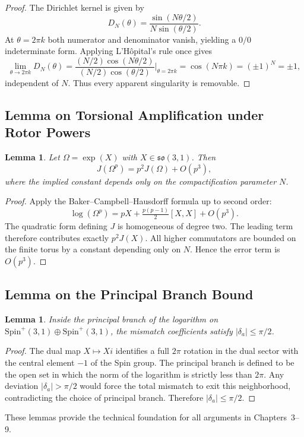 \documentclass[a4paper]{article}
\newtheorem{lemma}[theorem]{Lemma}
\theoremstyle{definition}
\theoremstyle{remark}
\begin{document}
\begin{proof}
The Dirichlet kernel is given by
\[
D_N(\theta) = \frac{\sin(N\theta/2)}{N\sin(\theta/2)}.
\]
At \( \theta = 2\pi k \) both numerator and denominator vanish, yielding a \( 0/0 \) indeterminate form. Applying L'Hôpital's rule once gives
\[
\lim_{\theta \to 2\pi k} D_N(\theta) = \frac{(N/2)\cos(N\theta/2)}{(N/2)\cos(\theta/2)} \Big|_{\theta=2\pi k} = \cos(N\pi k) = (\pm 1)^N = \pm 1,
\]
independent of \( N \). Thus every apparent singularity is removable.
\end{proof}

\subsection{Lemma on Torsional Amplification under Rotor Powers}

\begin{lemma}
Let \( \Omega = \exp(X) \) with \( X \in \mathfrak{so}(3,1) \). Then
\[
J(\Omega^p) = p^2 J(\Omega) + O(p^3),
\]
where the implied constant depends only on the compactification parameter \( N \).
\end{lemma}

\begin{proof}
Apply the Baker--Campbell--Hausdorff formula up to second order:
\[
\log(\Omega^p) = pX + \tfrac{p(p-1)}{2}[X,X] + O(p^3).
\]
The quadratic form defining \( J \) is homogeneous of degree two. The leading term therefore contributes exactly \( p^2 J(X) \). All higher commutators are bounded on the finite torus by a constant depending only on \( N \). Hence the error term is \( O(p^3) \).
\end{proof}

\subsection{Lemma on the Principal Branch Bound}

\begin{lemma}
Inside the principal branch of the logarithm on \( \mathrm{Spin}^+(3,1) \oplus \mathrm{Spin}^+(3,1) \), the mismatch coefficients satisfy \( |\delta_a| \leq \pi/2 \).
\end{lemma}

\begin{proof}
The dual map \( X \mapsto Xi \) identifies a full \( 2\pi \) rotation in the dual sector with the central element \( -1 \) of the Spin group. The principal branch is defined to be the open set in which the norm of the logarithm is strictly less than \( 2\pi \). Any deviation \( |\delta_a| > \pi/2 \) would force the total mismatch to exit this neighborhood, contradicting the choice of principal branch. Therefore \( |\delta_a| \leq \pi/2 \).
\end{proof}

These lemmas provide the technical foundation for all arguments in Chapters~3--9.
\end{document}

